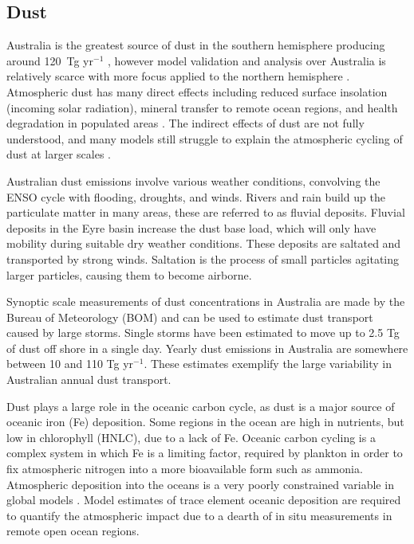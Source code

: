 \subsection{Dust}

Australia is the greatest source of dust in the southern hemisphere producing around 120~Tg yr$^{-1}$ \cite{Li_2008}, however model validation and analysis over Australia is relatively scarce with more focus applied to the northern hemisphere \cite{Duncan_Fairlie_2007,Ridley_2013}.
Atmospheric dust has many direct effects including reduced surface insolation (incoming solar radiation), mineral transfer to remote ocean regions, and health degradation in populated areas \cite{Shao_2007}.
The indirect effects of dust are not fully understood, and many models still struggle to explain the atmospheric cycling of dust at larger scales \cite{Rotstayn_2011}.

Australian dust emissions involve various weather conditions, convolving the ENSO cycle with flooding, droughts, and winds.
Rivers and rain build up the particulate matter in many areas, these are referred to as fluvial deposits.
Fluvial deposits in the Eyre basin increase the dust base load, which will only have mobility during suitable dry weather conditions.
These deposits are saltated and transported by strong winds\cite{Zender_2003}.
Saltation is the process of small particles agitating larger particles, causing them to become airborne.

Synoptic scale measurements of dust concentrations in Australia are made by the Bureau of Meteorology (BOM) and can be used to estimate dust transport caused by large storms. 
Single storms have been estimated to move up to 2.5 Tg of dust off shore in a single day.
Yearly dust emissions in Australia are somewhere between 10 and 110 Tg yr$^{-1}$.
These estimates exemplify the large variability in Australian annual dust transport.

Dust plays a large role in the oceanic carbon cycle, as dust is a major source of oceanic iron (Fe) deposition.
Some regions in the ocean are high in nutrients, but low in chlorophyll (HNLC), due to a lack of Fe.
Oceanic carbon cycling is a complex system in which Fe is a limiting factor, required by plankton in order to fix atmospheric nitrogen into a more bioavailable form such as ammonia.
Atmospheric deposition into the oceans is a very poorly constrained variable in global models \cite{Grand_2015}.
Model estimates of trace element oceanic deposition are required to quantify the atmospheric impact due to a dearth of in situ measurements in remote open ocean regions.

